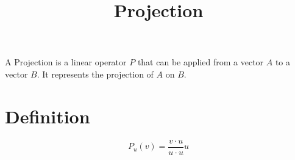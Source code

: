 \documentclass{article}
\begin{document}
\title{Projection}
A Projection is a linear operator $P$ that can be applied from a vector $A$ to a vector $B$.
It represents the projection of $A$ on $B$.

\section{Definition}

\begin{equation}
    P_u(v) = \frac{v \cdot u}{u \cdot u}u
\end{equation}
\end{document}
